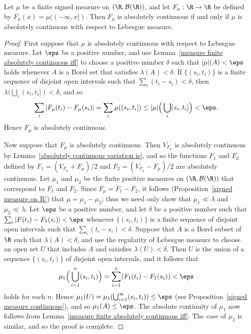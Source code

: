 \begin{proposition}\label{bounded variation absolutely continuous iff measure is}
Let $\mu$ be a finite signed measure on $(\R,\mathcal{B}(\R))$, and let $F_\mu:\R\to\R$ be defined by $F_\mu(x)=\mu((-\infty,x])$. Then $F_\mu$ is absolutely continuous if and only if $\mu$ is absolutely continuous with respect to Lebesgue measure.
\end{proposition}
\begin{proof}
First suppose that $\mu$ is absolutely continuous with respect to Lebesgue measure. Let $\eps$ be a positive number, and use Lemma~\ref{measure finite absolutely continuous iff} to choose a positive number $\delta$ such that $|\mu|(A)<\eps$ holds whenever $A$ is a Borel set that satisfies $\lambda(A)<\delta$. If $\{(s_i,t_i)\}$ is a finite sequence of disjoint open intervals such that $\sum_i(t_i-s_i)<\delta$, then $\lambda(\bigcup_i(s_i,t_i])<\delta$, and so
\[\sum_i|F_\mu(t_i)-F_\mu(s_i)|=\sum_i\mu((s_i,t_i])\leq|\mu|\Big(\bigcup_i(s_i,t_i]\Big)<\eps.\]
Hence $F_\mu$ is absolutely continuous.\par
Now suppose that $F_\mu$ is absolutely continuous. Then $V_{F_\mu}$ is absolutely continuous by Lemma~\ref{absolutely continuous variation is}, and so the functions $F_1$ and $F_2$ defined by $F_1=(V_{F_\mu}+F_\mu)/2$ and $F_2=(V_{F_\mu}-F_\mu)/2$ are absolutely continuous. Let $\mu_1$ and $\mu_2$ be the finite positive measures on $(\R,\mathcal{B}(\R))$ that correspond to $F_1$ and $F_2$. Since $F_\mu=F_1-F_2$, it follows (Proposition~\ref{signed measure on R}) that $\mu=\mu_1-\mu_2$; thus we need only show that $\mu_1\ll\lambda$ and $\mu_2\ll\lambda$. Let $\eps$ be a positive number, and let $\delta$ be a positive number such that $\sum_i|F(t_i)-F_1(s_i)|<\eps$ whenever $\{(s_i,t_i)\}$ is a finite sequence of disjoint open intervals such that $\sum_i(t_i-s_i)<\delta$. Suppose that $A$ is a Borel subset of $\R$ such that $\lambda(A)<\delta$, and use the regularity of Lebesgue measure to choose an open set $U$ that includes $A$ and satisfies $\lambda(U)<\delta$. Then $U$ is the union of a sequence $\{(s_i,t_i)\}$ of disjoint open intervals, and it follows that
\[\mu_1\Big(\bigcup_{i=1}^{n}(s_i,t_i)\Big)=\sum_{i=1}^{n}(F_1(t_i)-F_1(s_i))<\eps\]
holds for each $n$. Hence $\mu_1(U)=\mu_1(\bigcup_{i=1}^{\infty}(s_i,t_i))\leq\eps$ (see Proposition~\ref{signed measure continuous}), and so $\mu_1(A)\leq\eps$. The absolute continuity of $\mu_1$ now follows from Lemma~\ref{measure finite absolutely continuous iff}. The case of $\mu_2$ is similar, and so the proof is complete.
\end{proof}

